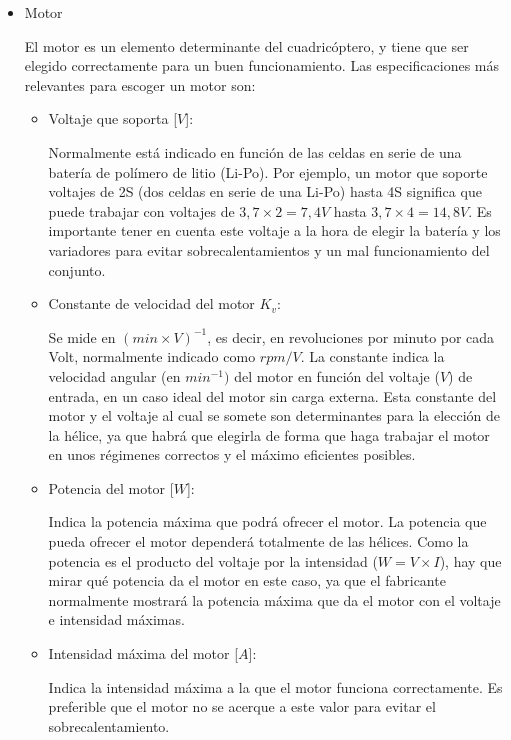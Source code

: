 \documentclass[12pt,twoside]{article}
\begin{document}
	\begin{itemize}
		
		\item Motor
		
		El motor es un elemento determinante del cuadricóptero, y tiene que ser elegido correctamente para un buen funcionamiento. Las especificaciones más relevantes para escoger un motor son:
			
			\begin{itemize}
				\item Voltaje que soporta [$V$]: 
				
				Normalmente está indicado en función de las celdas en serie de una batería de polímero de litio (Li-Po). Por ejemplo, un motor que soporte voltajes de 2S (dos celdas en serie de una Li-Po) hasta 4S significa que puede trabajar con voltajes de $3,7\times 2=7,4V$ hasta $3,7\times 4=14,8V$. Es importante tener en cuenta este voltaje a la hora de elegir la batería y los variadores para evitar sobrecalentamientos y un mal funcionamiento del conjunto.
				
				\item Constante de velocidad del motor $K_{v}$: 
				
				Se mide en $(min\times V)^{-1}$, es decir, en revoluciones por minuto por cada Volt, normalmente indicado como $rpm/V$. La constante indica la velocidad angular (en $min^{-1})$ del motor en función del voltaje ($V$) de entrada, en un caso ideal del motor sin carga externa. Esta constante del motor y el voltaje al cual se somete son determinantes para la elección de la hélice, ya que habrá que elegirla de forma que haga trabajar el motor en unos régimenes correctos y el máximo eficientes posibles.
				
				\item Potencia del motor [$W$]:
				
				Indica la potencia máxima que podrá ofrecer el motor. La potencia que pueda ofrecer el motor dependerá totalmente de las hélices. Como la potencia es el producto del voltaje por la intensidad ($W=V\times I$), hay que mirar qué potencia da el motor en este caso, ya que el fabricante normalmente mostrará la potencia máxima que da el motor con el voltaje e intensidad máximas.
				
				\item Intensidad máxima del motor [$A$]:
				
				Indica la intensidad máxima a la que el motor funciona correctamente. Es preferible que el motor no se acerque a este valor para evitar el sobrecalentamiento.
				

\end{itemize}
\end{itemize}
\end{document}
